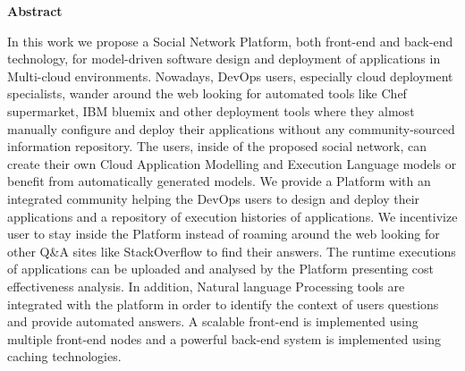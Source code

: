 \thispagestyle{empty}
\begin{titlepage}
\begin{center}
{\bf\Large Abstract}\\
\end{center}

\indent In this work we propose a Social Network Platform, both front-end and back-end technology, for model-driven software design and deployment of applications in Multi-cloud environments. Nowadays, DevOps users, especially cloud deployment specialists, wander around the web looking for automated tools like Chef supermarket, IBM bluemix and other deployment tools where they almost manually configure and deploy their applications without any community-sourced information repository. The users, inside of the proposed social network, can create their own Cloud Application Modelling and Execution
Language models or benefit from automatically generated models. We provide a Platform with an integrated community helping the DevOps users to design and deploy their applications and a repository of execution histories of applications. We incentivize user to stay inside the Platform instead of roaming around the web looking for other Q\&A sites like StackOverflow to find their answers. The runtime executions of applications can be uploaded and analysed by the Platform presenting cost effectiveness analysis. In addition, Natural language Processing tools are integrated with the platform in order to identify the context of users questions and provide automated answers. A scalable front-end is implemented using multiple front-end nodes and a powerful back-end system is implemented using caching technologies. 


\vfill
\end{titlepage}

